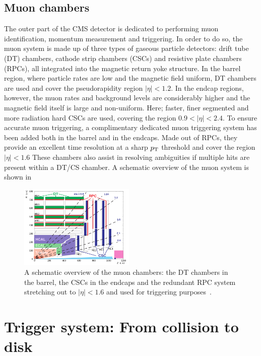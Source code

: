 \subsection{Muon chambers}
The outer part of the CMS detector is dedicated to performing muon identification, momentum measurement and triggering.
In order to do so, the muon system is made up of three types of gaseous particle detectors: drift tube (DT) chambers, cathode strip chambers (CSCs) and resistive plate chambers (RPCs), all integrated into the magnetic return yoke structure.
In the barrel region, where particle rates are low and the magnetic field uniform, DT chambers are used and cover the pseudorapidity region $|\eta|< 1.2$. In the endcap regions, however, the muon rates and background levels are considerably higher and the magnetic field itself is large and non-uniform. Here; faster, finer segmented and more radiation hard CSCs are used, covering the region $0.9 < |\eta|< 2.4$.
To ensure accurate muon triggering, a complimentary dedicated muon triggering system has been added both in the barrel and in the endcaps. Made out of RPCs, they provide an excellent time resolution at a sharp $p_{\mathrm{T}}$ threshold and cover the region $|\eta|< 1.6$
These chambers also assist in resolving ambiguities if multiple hits are present within a DT/CS chamber.
A schematic overview of the muon system is shown in

\begin{figure}[h] 
    \centering
    \includegraphics[width=0.49\textwidth]{figures/cms/MuonSys.png}
    \caption{A schematic overview of the muon chambers: the DT chambers in the barrel, the CSCs in the endcaps and the redundant RPC system stretching out to $|\eta|< 1.6$ and used for triggering purposes~\cite{Kim:1477844}.}
    \label{fig:cms:hcal-res}
\end{figure}



\section{Trigger system: From collision to disk}

